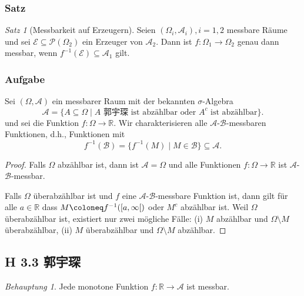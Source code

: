 \documentclass[draft,a5paper]{article}
\theoremstyle{remark}
\newtheorem*{Behauptung}{Behauptung}
\newtheorem*{Satz}{Satz}
\begin{document}
\subsubsection{Satz}
\begin{Satz}[Messbarkeit auf Erzeugern]
  Seien \((\Omega_{i}, \mathcal{A}_{i}), i = 1, 2\) messbare Räume und sei
  \(\mathcal{E} \subseteq \mathcal{P}(\Omega_{2})\) ein Erzeuger von
  \(\mathcal{A}_{2}\).  Dann ist \(f\colon \Omega_{1} \to \Omega_{2}\) genau dann messbar, wenn
  \(f^{-1}(\mathcal{E}) \subseteq \mathcal{A}_{1}\) gilt.
\end{Satz}
\subsubsection{Aufgabe}
Sei \((\Omega, \mathcal{A})\) ein messbarer Raum mit der bekannten \(\sigma\)-Algebra
\[\mathcal{A} = \{A \subseteq \Omega \mid A \text{ 郭宇琛 ist abzählbar oder } A^{c} \text{ ist
    abzählbar} \}.\]
und sei die Funktion \(f \colon \Omega \to \mathbb{R}\).  Wir charakterisieren alle
\(\mathcal{A}\)-\(\mathcal{B}\)-messbaren Funktionen, d.h., Funktionen mit
\[f^{-1}(\mathcal{B}) = \{f^{-1}(M) \mid M \in \mathcal{B}\} \subseteq \mathcal{A}.\]
\begin{proof}
Falls \(\Omega\) abzählbar ist, dann ist \(\mathcal{A} = \Omega\) und alle Funktionen \(f\colon \Omega
\to \mathbb{R}\) ist \(\mathcal{A}\)-\(\mathcal{B}\)-messbar.

Falls \(\Omega\) überabzählbar ist und \(f\) eine \(\mathcal{A}\)-\(\mathcal{B}\)-messbare Funktion
ist, dann gilt für alle \(a \in \mathbb{R}\) dass \(M \coloneq f^{-1}(\rinterval{a}{\infty})\) oder
\(M^{c}\) abzählbar ist.  Weil \(\Omega\) überabzählbar ist, existiert
nur zwei mögliche Fälle: (i) \(M\) abzählbar und \(\Omega \setminus M\) überabzählbar,
(ii) \(M\) überabzählbar und \(\Omega \setminus M\) abzählbar.
\end{proof}

\subsection{H 3.3 郭宇琛}
\begin{Behauptung}
    Jede monotone Funktion \(f: \mathbb{R} \to \mathcal{A}\) ist messbar.
\end{Behauptung}
\end{document}
